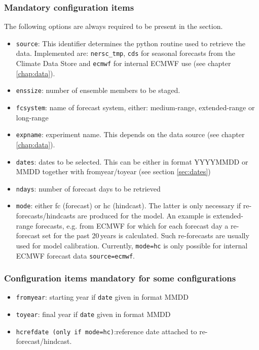 \documentclass[DIV=10, parskip=full]{scrreprt}
\begin{document}
\subsubsection{Mandatory configuration items}
The following options are always required to be present in the section.
\begin{itemize}
 \item \texttt{source}: This identifier determines the python routine used to retrieve the data. Implemented are:  \texttt{nersc\_tmp}, \texttt{cds} for seasonal forecasts from the Climate Data Store and \texttt{ecmwf} for internal ECMWF use (see chapter \ref{chap:data}).
 \item \texttt{enssize}: number of ensemble members to be staged. 
 \item \texttt{fcsystem}: name of forecast system, either: medium-range, extended-range or long-range
 \item \texttt{expname}: experiment name. This depends on the data source (see chapter \ref{chap:data}).
 \item \texttt{dates}: dates to be selected. This can be either in format YYYYMMDD or MMDD together with fromyear/toyear (see section \ref{sec:dates})
 \item \texttt{ndays}: number of forecast days to be retrieved
 \item \texttt{mode}: either fc (forecast) or hc (hindcast). The latter is only necessary if re-forecasts/hindcasts are produced for the model. An example is extended-range forecasts, e.g. from ECMWF for which for each forecast day a re-forecast set for the past 20\,years is calculated. Such re-forecasts are usually used for model calibration. Currently, \texttt{mode=hc} is only possible for internal ECMWF forecast data \texttt{source=ecmwf}.

\end{itemize}

\subsubsection{Configuration items mandatory for some configurations}
\begin{itemize}
	 \item \texttt{fromyear}: starting year if \texttt{date} given in format MMDD
	\item \texttt{toyear}: final year if \texttt{date} given in format MMDD
 \item \texttt{hcrefdate (only if mode=hc)}:reference date attached to re-forecast/hindcast. 
\end{itemize}
\end{document}
